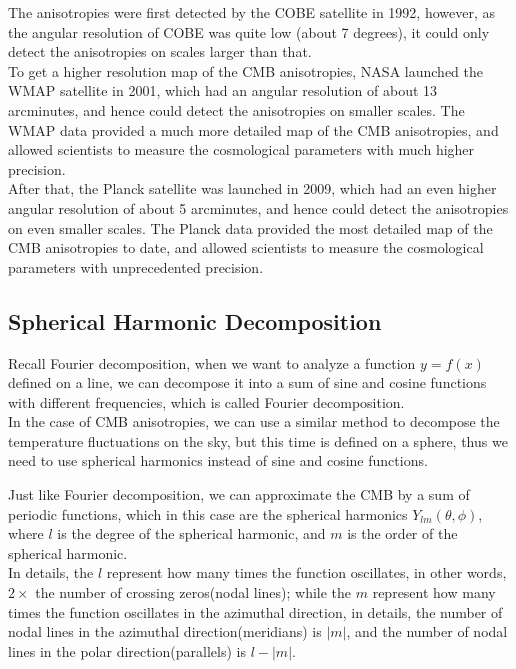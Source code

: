 \begin{extra}
    The anisotropies were first detected by the COBE satellite in 1992, however, as the angular resolution of COBE was quite low (about 7 degrees), it could only detect the anisotropies on scales larger than that. \\

    To get a higher resolution map of the CMB anisotropies, NASA launched the WMAP satellite in 2001, which had an angular resolution of about 13 arcminutes, and hence could detect the anisotropies on smaller scales. The WMAP data provided a much more detailed map of the CMB anisotropies, and allowed scientists to measure the cosmological parameters with much higher precision. \\

    After that, the Planck satellite was launched in 2009, which had an even higher angular resolution of about 5 arcminutes, and hence could detect the anisotropies on even smaller scales. The Planck data provided the most detailed map of the CMB anisotropies to date, and allowed scientists to measure the cosmological parameters with unprecedented precision. \\
\end{extra}

\bigskip \noindent \bigskip \noindent \bigskip \noindent
\subsection{Spherical Harmonic Decomposition}
\begin{intuition}
    Recall Fourier decomposition, when we want to analyze a function $y = f(x)$ defined on a line, we can decompose it into a sum of sine and cosine functions with different frequencies, which is called Fourier decomposition. \\

    In the case of CMB anisotropies, we can use a similar method to decompose the temperature fluctuations on the sky, but this time is defined on a sphere, thus we need to use spherical harmonics instead of sine and cosine functions. 
\end{intuition}

\begin{foundation}
    Just like Fourier decomposition, we can approximate the CMB by a sum of periodic functions, which in this case are the spherical harmonics $Y_{lm}(\theta, \phi)$, where $l$ is the degree of the spherical harmonic, and $m$ is the order of the spherical harmonic. \\

    In details, the $l$ represent how many times the function oscillates, in other words, $2 \times$ the number of crossing zeros(nodal lines); while the $m$ represent how many times the function oscillates in the azimuthal direction, in details, the number of nodal lines in the azimuthal direction(meridians) is $|m|$, and the number of nodal lines in the polar direction(parallels) is $l - |m|$.
\end{foundation}

